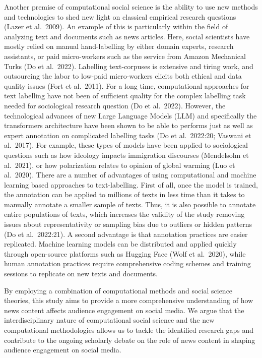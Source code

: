 \documentclass[
]{article}
\begin{document}
Another premise of computational social science is the ability to use
new methods and technologies to shed new light on classical empirical
research questions (Lazer et al.~2009). An example of this is
particularly within the field of analyzing text and documents such as
news articles. Here, social scientists have mostly relied on manual
hand-labelling by either domain experts, research assistants, or paid
micro-workers such as the service from Amazon Mechanical Turks (Do et
al.~2022). Labelling text-corpuses is extensive and tiring work, and
outsourcing the labor to low-paid micro-workers elicits both ethical and
data quality issues (Fort et al.~2011). For a long time, computational
approaches for text labelling have not been of sufficient quality for
the complex labelling task needed for sociological research question (Do
et al.~2022). However, the technological advances of new Large Language
Models (LLM) and specifically the transformers architecture have been
shown to be able to performs just as well as expert annotation on
complicated labelling tasks (Do et al.~2022:20; Vaswani et al.~2017).
For example, these types of models have been applied to sociological
questions such as how ideology impacts immigration discourses
(Mendelsohn et al.~2021), or how polarization relates to opinion of
global warming (Luo et al.~2020). There are a number of advantages of
using computational and machine learning based approaches to
text-labelling. First of all, once the model is trained, the annotation
can be applied to millions of texts in less time than it takes to
manually annotate a smaller sample of texts. Thus, it is also possible
to annotate entire populations of texts, which increases the validity of
the study removing issues about representativity or sampling bias due to
outliers or hidden patterns (Do et al.~2022:21). A second advantage is
that annotation practices are easier replicated. Machine learning models
can be distributed and applied quickly through open-source platforms
such as Hugging Face (Wolf et al.~2020), while human annotation
practices require comprehensive coding schemes and training sessions to
replicate on new texts and documents.

By employing a combination of computational methods and social science
theories, this study aims to provide a more comprehensive understanding
of how news content affects audience engagement on social media. We
argue that the interdisciplinary nature of computational social science
and the new computational methodologies allows us to tackle the
identified research gaps and contribute to the ongoing scholarly debate
on the role of news content in shaping audience engagement on social
media.
\end{document}
